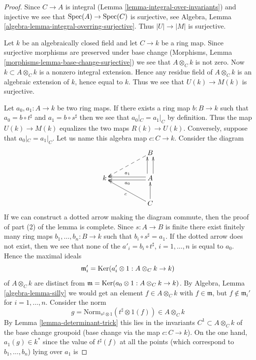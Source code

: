 \begin{proof}
Since $C \to A$ is integral (Lemma \ref{lemma-integral-over-invariants})
and injective we see that $\mathop{\mathrm{Spec}}(A) \to \mathop{\mathrm{Spec}}(C)$ is surjective, see
Algebra, Lemma \ref{algebra-lemma-integral-overring-surjective}.
Thus $|U| \to |M|$ is surjective.

\medskip\noindent
Let $k$ be an algebraically closed field and let $C \to k$ be a ring map.
Since surjective morphisms are preserved under base change
(Morphisms, Lemma \ref{morphisms-lemma-base-change-surjective})
we see that $A \otimes_C k$ is not zero. Now $k \subset A \otimes_C k$ is a
nonzero integral extension. Hence any residue field of $A \otimes_C k$
is an algebraic extension of $k$, hence equal to $k$. Thus we see that
$U(k) \to M(k)$ is surjective.

\medskip\noindent
Let $a_0, a_1 : A \to k$ be two ring maps. If there exists a ring map
$b : B \to k$ such that $a_0 = b \circ t^\sharp$ and $a_1 = b \circ s^\sharp$
then we see that $a_0|_C = a_1|_C$ by definition. Thus the map
$U(k) \to M(k)$ equalizes the two maps $R(k) \to U(k)$.
Conversely, suppose that $a_0|_C = a_1|_C$. Let us name this algebra
map $c : C \to k$. Consider the diagram
$$
\xymatrix{
& &
B \ar@{-->}[lld] \\
k & &
A
\ar@<0.5ex>[ll]^{a_0}
\ar@<-0.5ex>[ll]_{a_1}
\ar@<1ex>[u]
\ar@<-1ex>[u] \\
& &
C \ar[u] \ar[llu]^c
}
$$
If we can construct a dotted arrow making the diagram commute, then
the proof of part (2) of the lemma is complete. Since $s : A \to B$ is finite
there exist finitely many ring maps
$b_1, \ldots, b_n : B \to k$ such that $b_i \circ s^\sharp = a_1$.
If the dotted arrow does not exist, then we see that none of the
$a'_i = b_i \circ t^\sharp$, $i = 1, \ldots, n$ is equal to $a_0$.
Hence the maximal ideals
$$
\mathfrak m'_i = \mathop{\mathrm{Ker}}(a_i' \otimes 1 : A \otimes_C k \to k)
$$
of $A \otimes_C k$ are distinct from
$\mathfrak m = \mathop{\mathrm{Ker}}(a_0 \otimes 1 : A \otimes_C k \to k)$.
By Algebra, Lemma \ref{algebra-lemma-silly} we would get an element
$f \in A \otimes_C k$ with $f \in \mathfrak m$, but
$f \not \in \mathfrak m_i'$ for $i = 1, \ldots, n$.
Consider the norm
$$
g = \text{Norm}_{s^\sharp \otimes 1}(t^\sharp \otimes 1(f))
\in
A \otimes_C k
$$
By Lemma \ref{lemma-determinant-trick} this lies in the invariants
$C^1 \subset A \otimes_C k$ of the base change
groupoid (base change via the map $c : C \to k$). On the one hand,
$a_1(g) \in k^*$ since
the value of $t^\sharp(f)$ at all the points (which correspond to
$b_1, \ldots, b_n$) lying over $a_1$ is

\end{proof}

